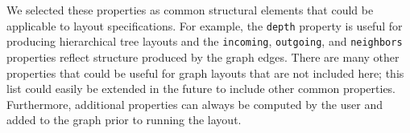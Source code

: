 
We selected these properties as common structural elements that could be
applicable to layout specifications. For example, the \texttt{depth}
property is useful for producing hierarchical tree layouts and the 
\texttt{incoming}, \texttt{outgoing}, and \texttt{neighbors} properties
reflect structure produced by the graph edges. There are many other
properties that could be useful for graph layouts that are not included 
here; this list could easily be extended in the future to include other
common properties. Furthermore, additional properties can always be
computed by the user and added to the graph prior to running the layout.